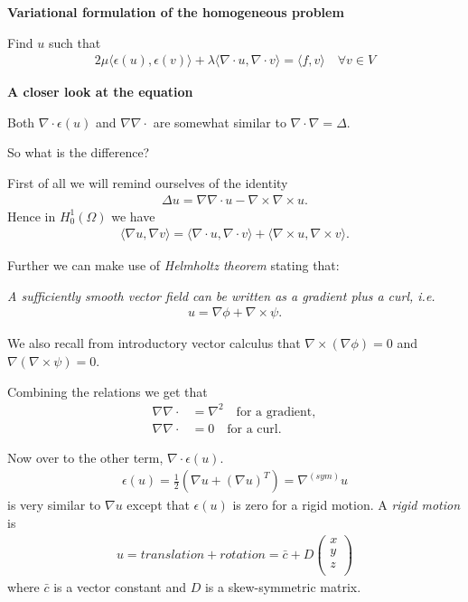 \documentclass[epsfig,11pt]{article}
\newcommand{\inr}[1]{ \Big \langle #1 \Big \rangle}
\begin{document}
\textbf{Variational formulation of the homogeneous problem}

Find $u$ such that 
\begin{align}
  2\mu \inr{\epsilon(u) , \epsilon(v) } +\lambda \inr{\nabla \cdot u,\nabla \cdot v} = \inr{f,v} \quad \forall v \in V
\end{align} 

\textbf{A closer look at the equation}

Both $\nabla \cdot \epsilon(u)$ and $\nabla \nabla \cdot $ are somewhat similar to $\nabla \cdot \nabla = \Delta$.

So what is the difference?

First of all we will remind ourselves of the identity
\begin{align}
\Delta u = \nabla \nabla \cdot u - \nabla \times \nabla \times u.  
\end{align}
Hence in $H_0^1(\Omega)$ we have 
\begin{align}
\inr{\nabla u,\nabla v} = \inr{\nabla \cdot u,\nabla \cdot v} + \inr{\nabla \times u,\nabla \times v}.
\end{align}

Further we can make use of \emph{Helmholtz theorem} stating that:

\emph{A sufficiently smooth vector field can be written as a gradient plus a curl, i.e.}
\begin{align}
u = \nabla \phi + \nabla \times \psi.
\end{align} 

We also recall from introductory vector calculus that $\nabla \times (\nabla \phi)=0$ and $\nabla (\nabla \times \psi)=0$.

Combining the relations we get that
\begin{align*}
\nabla \nabla \cdot &= \nabla^2 \quad \text{for a gradient}, \\
\nabla \nabla \cdot &= 0  \quad \text{for a curl}.
\end{align*}

Now over to the other term, $\nabla \cdot \epsilon(u)$.
\begin{align*}
\epsilon(u) = \frac{1}{2} \left( \nabla u + (\nabla u)^T \right) = \nabla^{(sym)}u
\end{align*}
is very similar to $\nabla u$ except that $\epsilon(u)$ is zero for a rigid motion. A \emph{rigid motion} is 
\begin{align}
u =  translation+rotation =  \bar{c} + D \begin{pmatrix}
x  \\
y \\
z \\
\end{pmatrix}
\end{align}
where $\bar{c}$ is a vector constant and $D$ is a skew-symmetric matrix.
\end{document}
